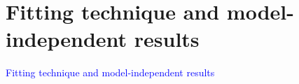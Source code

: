 \documentclass[compress]{beamer}
\begin{document}
\begin{frame}
\begin{columns}
\end{columns}
\end{frame}

\section*{Fitting technique and model-independent results}
\begin{frame}
\begin{center}
\Huge \textcolor{blue}{Fitting technique and model-independent results}
\end{center}
\end{frame}
\end{document}
